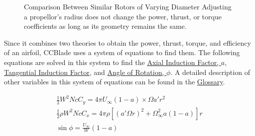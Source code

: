 \documentclass{article}
\begin{document}
\begin{figure}
  \centering
  \caption{Comparison Between Similar Rotors of Varying Diameter \newline Adjusting a propellor's radius does not change the power, thrust, or torque coefficients as long as its geometry remains the same.}
  \label{fig:1}
\end{figure}

Since it combines two theories to obtain the power, thrust, torque, and efficiency of an airfoil, CCBlade uses a system of equations to find them. The following equations are solved in this system to find the  \hyperlink{a}{Axial Induction Factor, $a$}, \hyperlink{a'}{Tangential Induction Factor}, and \hyperlink{phi}{Angle of Rotation, $\phi$}. A detailed description of other variables in this system of equations can be found in the \hyperlink{BEM}{Glossary}. \newline

\begin{equation}
\begin{aligned}
	\frac{1}{2} W^{2} N c C_{y} = 4 \pi U_{\infty} (1 - a) \times \Omega a' r^{2} \\
	\frac{1}{2} \rho W^{2} N c C_{x} = 4 \pi \rho [(a' \Omega r)^{2} + \Omega^{2}_{\infty} a (1 - a)] r \\
	\sin \phi = \frac{U_{\infty}}{W} (1 - a)
\end{aligned}
\end{equation}
\end{document}
